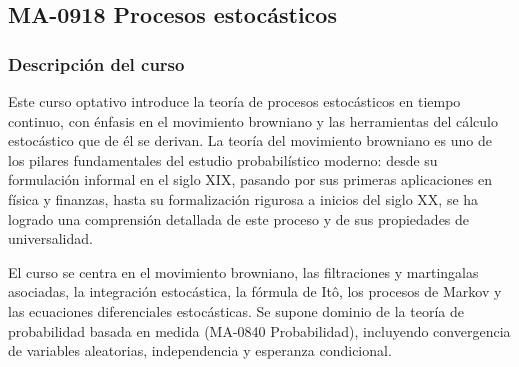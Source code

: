 \newpage
\subsection*{MA-0918 Procesos estocásticos}

\hypertarget{MA0918}{}
\begin{refsection}
\begin{table}[H]
\end{table}

\subsubsection*{Descripción del curso}

Este curso optativo introduce la teoría de procesos estocásticos en tiempo continuo, con énfasis en el movimiento browniano y las herramientas del cálculo estocástico que de él se derivan. La teoría del movimiento browniano es uno de los pilares fundamentales del estudio probabilístico moderno: desde su formulación informal en el siglo XIX, pasando por sus primeras aplicaciones en física y finanzas, hasta su formalización rigurosa a inicios del siglo XX, se ha logrado una comprensión detallada de este proceso y de sus propiedades de universalidad.

El curso se centra en el movimiento browniano, las filtraciones y martingalas asociadas, la integración estocástica, la fórmula de Itô, los procesos de Markov y las ecuaciones diferenciales estocásticas. Se supone dominio de la teoría de probabilidad basada en medida (MA-0840 Probabilidad), incluyendo convergencia de variables aleatorias, independencia y esperanza condicional.


\end{refsection}
